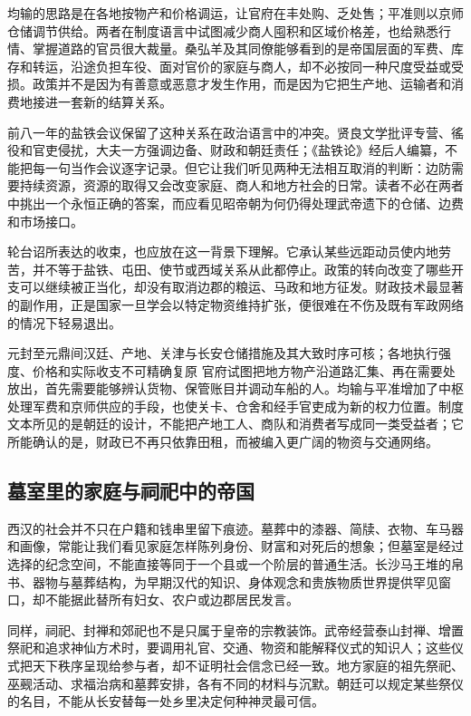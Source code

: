 均输的思路是在各地按物产和价格调运，让官府在丰处购、乏处售；平准则以京师仓储调节供给。两者在制度语言中试图减少商人囤积和区域价格差，也给熟悉行情、掌握道路的官员很大裁量。桑弘羊及其同僚能够看到的是帝国层面的军费、库存和转运，沿途负担车役、面对官价的家庭与商人，却不必按同一种尺度受益或受损。政策并不是因为有善意或恶意才发生作用，而是因为它把生产地、运输者和消费地接进一套新的结算关系。

前八一年的盐铁会议保留了这种关系在政治语言中的冲突。贤良文学批评专营、徭役和官吏侵扰，大夫一方强调边备、财政和朝廷责任；《盐铁论》经后人编纂，不能把每一句当作会议逐字记录。但它让我们听见两种无法相互取消的判断：边防需要持续资源，资源的取得又会改变家庭、商人和地方社会的日常。读者不必在两者中挑出一个永恒正确的答案，而应看见昭帝朝为何仍得处理武帝遗下的仓储、边费和市场接口。

轮台诏所表达的收束，也应放在这一背景下理解。它承认某些远距动员使内地劳苦，并不等于盐铁、屯田、使节或西域关系从此都停止。政策的转向改变了哪些开支可以继续被正当化，却没有取消边郡的粮运、马政和地方征发。财政技术最显著的副作用，正是国家一旦学会以特定物资维持扩张，便很难在不伤及既有军政网络的情况下轻易退出。

\begin{event}{}{元封至元鼎间}{汉廷、产地、关津与长安仓储}{措施及其大致时序可核；各地执行强度、价格和实际收支不可精确复原}
官府试图把地方物产沿道路汇集、再在需要处放出，首先需要能够辨认货物、保管账目并调动车船的人。均输与平准增加了中枢处理军费和京师供应的手段，也使关卡、仓舍和经手官吏成为新的权力位置。制度文本所见的是朝廷的设计，不能把产地工人、商队和消费者写成同一类受益者；它所能确认的是，财政已不再只依靠田租，而被编入更广阔的物资与交通网络。
\end{event}

\subsection{墓室里的家庭与祠祀中的帝国}

西汉的社会并不只在户籍和钱串里留下痕迹。墓葬中的漆器、简牍、衣物、车马器和画像，常能让我们看见家庭怎样陈列身份、财富和对死后的想象；但墓室是经过选择的纪念空间，不能直接等同于一个县或一个阶层的普通生活。长沙马王堆的帛书、器物与墓葬结构，为早期汉代的知识、身体观念和贵族物质世界提供罕见窗口，却不能据此替所有妇女、农户或边郡居民发言。

同样，祠祀、封禅和郊祀也不是只属于皇帝的宗教装饰。武帝经营泰山封禅、增置祭祀和追求神仙方术时，要调用礼官、交通、物资和能解释仪式的知识人；这些仪式把天下秩序呈现给参与者，却不证明社会信念已经一致。地方家庭的祖先祭祀、巫觋活动、求福治病和墓葬安排，各有不同的材料与沉默。朝廷可以规定某些祭仪的名目，不能从长安替每一处乡里决定何种神灵最可信。

